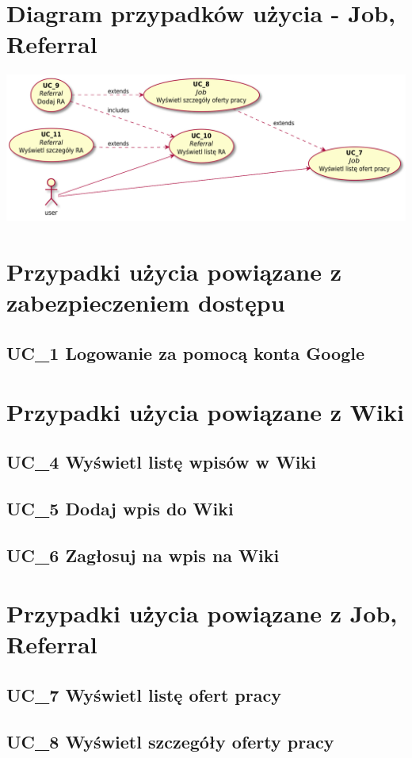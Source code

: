 \documentclass[oneside]{scrreprt}
\begin{document}
\section{Diagram przypadków użycia - Job, Referral}
\includegraphics[width=\textwidth, keepaspectratio]{graphics/job_referral_use_case_diagram.pdf}

\section{Przypadki użycia powiązane z zabezpieczeniem dostępu}
\subsection{UC\_1 Logowanie za pomocą konta Google}

\section{Przypadki użycia powiązane z Wiki}
\subsection{UC\_4 Wyświetl listę wpisów w Wiki}
\subsection{UC\_5 Dodaj wpis do Wiki}
\subsection{UC\_6 Zagłosuj na wpis na Wiki}

\section{Przypadki użycia powiązane z Job, Referral}
\subsection{UC\_7 Wyświetl listę ofert pracy}
\subsection{UC\_8 Wyświetl szczegóły oferty pracy}
\end{document}
